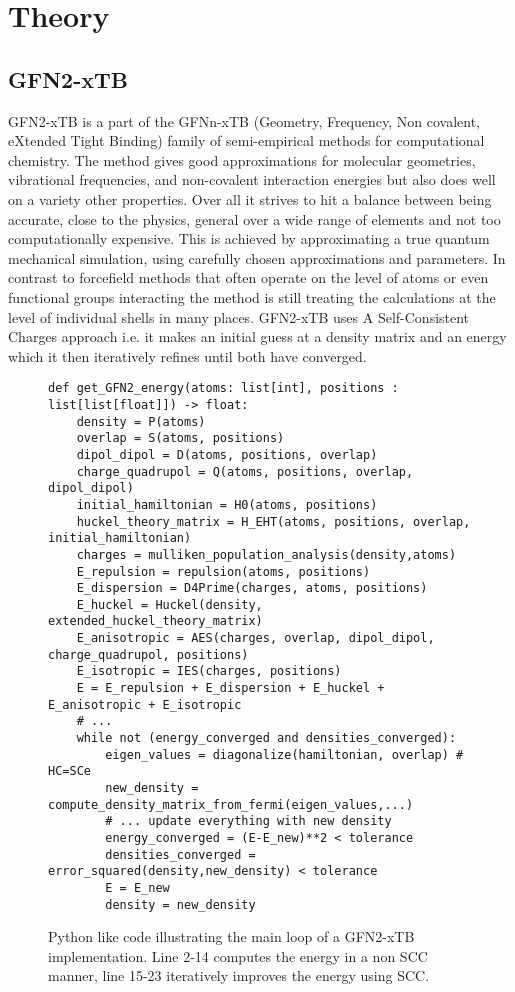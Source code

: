 \chapter{Theory}
\section{GFN2-xTB}
GFN2-xTB is a part of the GFNn-xTB (Geometry, Frequency, Non covalent, eXtended Tight Binding) family of semi-empirical methods for computational chemistry. 
The method gives good approximations for molecular geometries, vibrational frequencies, and non-covalent interaction energies but also does well on a variety other properties. 
Over all it strives to hit a balance between being accurate, close to the physics, general over a wide range of elements and not too computationally expensive.
This is achieved by approximating a true quantum mechanical simulation, using carefully chosen approximations and parameters. 
In contrast to forcefield methods that often operate on the level of atoms or even functional groups interacting the method is still treating the calculations at the level of individual shells in many places. 
GFN2-xTB uses A Self-Consistent Charges approach i.e. it makes an initial guess at a density matrix and an energy which it then iteratively refines until both have converged. 

\begin{figure}[H]
\begin{verbatim}
def get_GFN2_energy(atoms: list[int], positions : list[list[float]]) -> float:
    density = P(atoms)
    overlap = S(atoms, positions)
    dipol_dipol = D(atoms, positions, overlap)
    charge_quadrupol = Q(atoms, positions, overlap, dipol_dipol)
    initial_hamiltonian = H0(atoms, positions)
    huckel_theory_matrix = H_EHT(atoms, positions, overlap, initial_hamiltonian)
    charges = mulliken_population_analysis(density,atoms)
    E_repulsion = repulsion(atoms, positions)
    E_dispersion = D4Prime(charges, atoms, positions)
    E_huckel = Huckel(density, extended_huckel_theory_matrix)
    E_anisotropic = AES(charges, overlap, dipol_dipol, charge_quadrupol, positions)
    E_isotropic = IES(charges, positions)
    E = E_repulsion + E_dispersion + E_huckel + E_anisotropic + E_isotropic
    # ...
    while not (energy_converged and densities_converged):
        eigen_values = diagonalize(hamiltonian, overlap) # HC=SCe 
        new_density = compute_density_matrix_from_fermi(eigen_values,...)
        # ... update everything with new density
        energy_converged = (E-E_new)**2 < tolerance
        densities_converged = error_squared(density,new_density) < tolerance
        E = E_new
        density = new_density
\end{verbatim}
\caption{Python like code illustrating the main loop of a GFN2-xTB implementation.
Line 2-14 computes the energy in a non SCC manner, line 15-23 iteratively improves the energy using SCC.
}
\end{figure}

